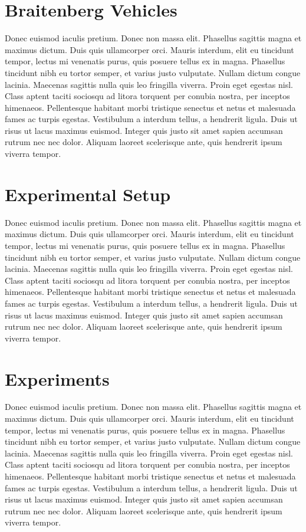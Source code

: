 \documentclass[format=acmsmall, review=false, screen=true]{acmart}
\begin{document}
\section{Braitenberg Vehicles}

Donec euismod iaculis pretium. Donec non massa elit. Phasellus sagittis magna et maximus dictum. Duis quis ullamcorper orci. Mauris interdum, elit eu tincidunt tempor, lectus mi venenatis purus, quis posuere tellus ex in magna. Phasellus tincidunt nibh eu tortor semper, et varius justo vulputate. Nullam dictum congue lacinia. Maecenas sagittis nulla quis leo fringilla viverra. Proin eget egestas nisl. Class aptent taciti sociosqu ad litora torquent per conubia nostra, per inceptos himenaeos. Pellentesque habitant morbi tristique senectus et netus et malesuada fames ac turpis egestas. Vestibulum a interdum tellus, a hendrerit ligula. Duis ut risus ut lacus maximus euismod. Integer quis justo sit amet sapien accumsan rutrum nec nec dolor. Aliquam laoreet scelerisque ante, quis hendrerit ipsum viverra tempor.

\section{Experimental Setup}

Donec euismod iaculis pretium. Donec non massa elit. Phasellus sagittis magna et maximus dictum. Duis quis ullamcorper orci. Mauris interdum, elit eu tincidunt tempor, lectus mi venenatis purus, quis posuere tellus ex in magna. Phasellus tincidunt nibh eu tortor semper, et varius justo vulputate. Nullam dictum congue lacinia. Maecenas sagittis nulla quis leo fringilla viverra. Proin eget egestas nisl. Class aptent taciti sociosqu ad litora torquent per conubia nostra, per inceptos himenaeos. Pellentesque habitant morbi tristique senectus et netus et malesuada fames ac turpis egestas. Vestibulum a interdum tellus, a hendrerit ligula. Duis ut risus ut lacus maximus euismod. Integer quis justo sit amet sapien accumsan rutrum nec nec dolor. Aliquam laoreet scelerisque ante, quis hendrerit ipsum viverra tempor.

\section{Experiments}

Donec euismod iaculis pretium. Donec non massa elit. Phasellus sagittis magna et maximus dictum. Duis quis ullamcorper orci. Mauris interdum, elit eu tincidunt tempor, lectus mi venenatis purus, quis posuere tellus ex in magna. Phasellus tincidunt nibh eu tortor semper, et varius justo vulputate. Nullam dictum congue lacinia. Maecenas sagittis nulla quis leo fringilla viverra. Proin eget egestas nisl. Class aptent taciti sociosqu ad litora torquent per conubia nostra, per inceptos himenaeos. Pellentesque habitant morbi tristique senectus et netus et malesuada fames ac turpis egestas. Vestibulum a interdum tellus, a hendrerit ligula. Duis ut risus ut lacus maximus euismod. Integer quis justo sit amet sapien accumsan rutrum nec nec dolor. Aliquam laoreet scelerisque ante, quis hendrerit ipsum viverra tempor.
\end{document}
